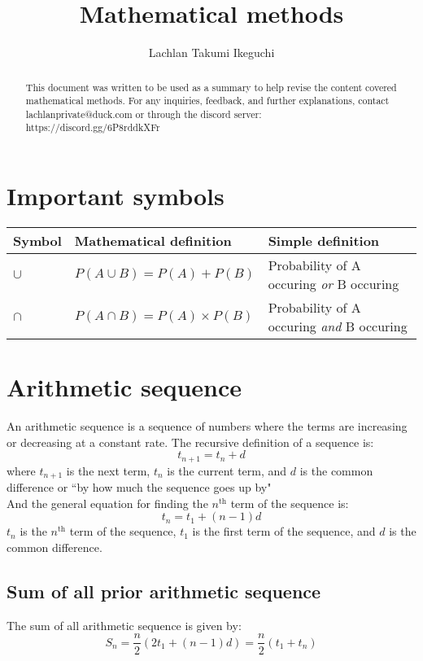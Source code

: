 \documentclass[a4paper,10pt]{report}
\title{Mathematical methods}
\author{Lachlan Takumi Ikeguchi}
\begin{document}
\maketitle
\tableofcontents

\begin{abstract}
	This document was written to be used as a summary to help revise the content covered mathematical methods.  For any inquiries, feedback, and further explanations, contact lachlanprivate@duck.com or through the discord server: https://discord.gg/6P8rddkXFr
\end{abstract}

\section{Important symbols}
\begin{center}
	\begin{tabular}{l|lp{6cm}}
		Symbol & Mathematical definition          & Simple definition                               \\ \hline
		$\cup$ & $P(A \cup B) = P(A) + P(B)$      & Probability of A occuring \emph{or} B occuring  \\
		$\cap$ & $P(A \cap B) = P(A) \times P(B)$ & Probability of A occuring \emph{and} B occuring \\
	\end{tabular}
\end{center}

\pagebreak

\section{Arithmetic sequence}
An arithmetic sequence is a sequence of numbers where the terms are increasing or decreasing at a constant rate.  The recursive definition of a sequence is:
$$t_{n + 1} = t_n + d$$
where $t_{n + 1}$ is the next term, $t_n$ is the current term, and $d$ is the common difference or ``by how much the sequence goes up by"\\

And the general equation for finding the $n^{\text{th}}$ term of the sequence is:
$$t_n = t_1 + (n - 1)d$$
$t_n$ is the $n^{\text{th}}$ term of the sequence, $t_1$ is the first term of the sequence, and $d$ is the common difference.

\subsection{Sum of all prior arithmetic sequence}
The sum of all arithmetic sequence is given by:
$$S_n = \frac{n}{2}(2t_1 + (n - 1)d) = \frac{n}{2}(t_1 + t_n)$$
\end{document}
